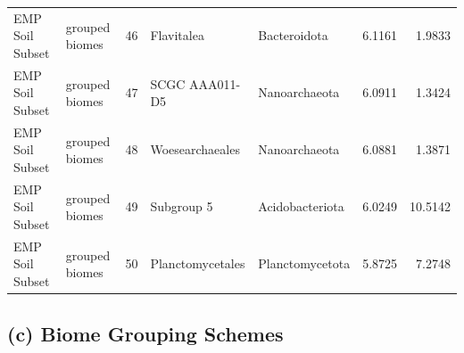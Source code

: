 \documentclass[12pt, oneside]{report}
\begin{document}
\begin{center}
\begin{longtable}{llrp{2.7cm}p{2.2cm}rr}
EMP Soil Subset & grouped biomes & 46 & Flavitalea & Bacteroidota & 6.1161 & 1.9833 \\
EMP Soil Subset & grouped biomes & 47 & SCGC AAA011-D5 & Nanoarchaeota & 6.0911 & 1.3424 \\
EMP Soil Subset & grouped biomes & 48 & Woesearchaeales & Nanoarchaeota & 6.0881 & 1.3871 \\
EMP Soil Subset & grouped biomes & 49 & Subgroup 5 & Acidobacteriota & 6.0249 & 10.5142 \\
EMP Soil Subset & grouped biomes & 50 & Planctomycetales & Planctomycetota & 5.8725 & 7.2748 \\
\end{longtable}
\end{center}

\subsection*{(c) Biome Grouping Schemes}
\end{document}
